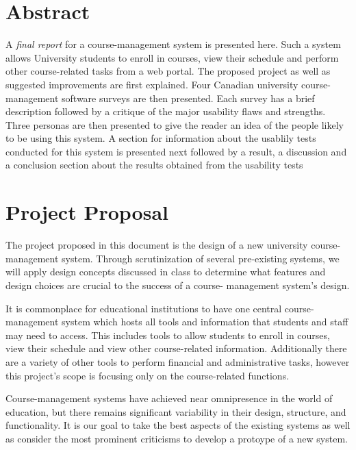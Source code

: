 \documentclass[10pt]{article}
\begin{document}
\begin{multicols}{2}

\section*{Abstract}
A \emph{final report} for a course-management system is presented 
here. Such a system allows University students to enroll in courses, view their 
schedule and perform other course-related tasks from a web portal. The proposed 
project as well as suggested improvements are first explained. Four Canadian 
university course-management software surveys are then presented. Each survey 
has a brief description followed by a critique of the major usability flaws and 
strengths. Three personas are then presented to give the reader an idea of the 
people likely to be using this system. A section for information about the usablily 
tests conducted for this system is presented next followed by a result, a discussion
and a conclusion section about the results obtained from the usability tests
\section*{Project Proposal}

The project proposed in this document is the design of a new 
university course-management system. Through scrutinization of several 
pre-existing systems, we will apply design concepts discussed in class to 
determine what features and design choices are crucial to the success of a course-
management system's design.

It is commonplace for educational institutions to have one central course-
management system which hosts all tools and information that students and staff 
may need to access. This includes tools to allow students to enroll in courses, 
view their schedule and view other course-related information. Additionally 
there are a variety of other tools to perform financial and administrative 
tasks, however this project's scope is focusing only on the course-related 
functions.

Course-management systems have achieved near omnipresence in 
the world of education, but there remains significant variability in their design, 
structure, and functionality. It is our goal to take the best aspects of the 
existing systems as well as consider the most prominent criticisms to develop a protoype of a new system.


\end{multicols}
\end{document}
